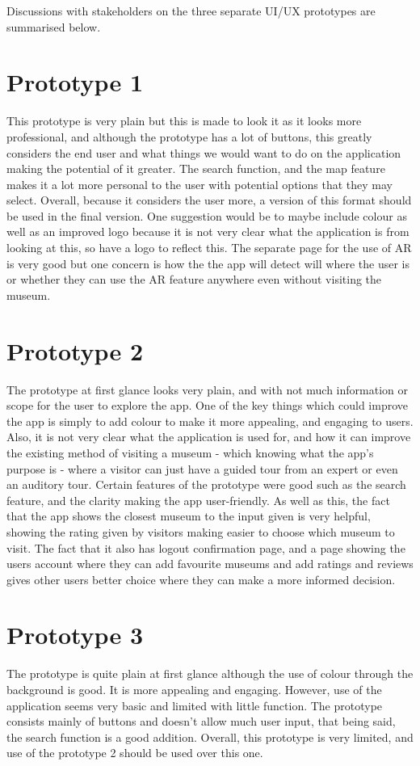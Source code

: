 {

Discussions with stakeholders on the three separate UI/UX prototypes are summarised below.

\section*{Prototype 1}
This prototype is very plain but this is made to look it as it looks more professional, and although the prototype has a lot of buttons, this greatly considers the end user and what things we would want to do on the application making the potential of it greater. The search function, and the map feature makes it a lot more personal to the user with potential options that they may select. Overall, because it considers the user more, a version of this format should be used in the final version. One suggestion would be to maybe include colour as well as an improved logo because it is not very clear what the application is from looking at this, so have a logo to reflect this. The separate page for the use of AR is very good but one concern is how the the app will detect will where the user is or whether they can use the AR feature anywhere even without visiting the museum.\\

\section*{Prototype 2}
The prototype at first glance looks very plain, and with not much information or scope for the user to explore the app. One of the key things which could improve the app is simply to add colour to make it more appealing, and engaging to users. Also, it is not very clear what the application is used for, and how it can improve the existing method of visiting a museum - which knowing what the app’s purpose is - where a visitor can just have a guided tour from an expert or even an auditory tour. Certain features of the prototype were good such as the search feature, and the clarity making the app user-friendly. As well as this, the fact that the app shows the closest museum to the input given is very helpful, showing the rating given by visitors making easier to choose which museum to visit. The fact that it also has logout confirmation page, and a page showing the users account where they can add favourite museums and add ratings and reviews gives other users better choice where they can make a more informed decision.\\

\section*{Prototype 3}
The prototype is quite plain at first glance although the use of colour through the background is good. It is more appealing and engaging. However, use of the application seems very basic and limited with little function. The prototype consists mainly of buttons and doesn’t allow much user input, that being said, the search function is a good addition. Overall, this prototype is very limited, and use of the prototype 2 should be used over this one.

}